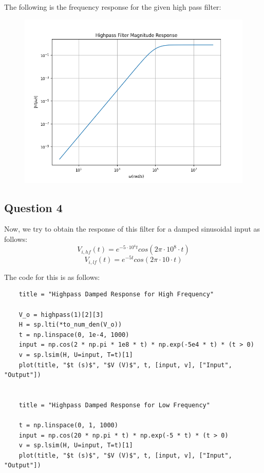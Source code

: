 \documentclass[12pt, a4paper]{article}
\begin{document}
The following is the frequency response for the given high pass filter:

\begin{figure}[H]
    \centering
    \includegraphics[scale=0.6]{3.png}
\end{figure}

\subsection{Question 4}
Now, we try to obtain the response of this filter for a damped sinusoidal input as follows:
\[V_{i, hf}(t) = e^{-5 \cdot 10^4t} cos(2\pi \cdot 10^8 \cdot t) \]
\[V_{i, lf}(t) = e^{-5t} cos(2\pi \cdot 10 \cdot t)\]

The code for this is as follows:
\begin{lstlisting}
    title = "Highpass Damped Response for High Frequency"

    V_o = highpass(1)[2][3]
    H = sp.lti(*to_num_den(V_o))
    t = np.linspace(0, 1e-4, 1000)
    input = np.cos(2 * np.pi * 1e8 * t) * np.exp(-5e4 * t) * (t > 0)
    v = sp.lsim(H, U=input, T=t)[1]
    plot(title, "$t (s)$", "$V (V)$", t, [input, v], ["Input", "Output"])
    
    
    title = "Highpass Damped Response for Low Frequency"
    
    t = np.linspace(0, 1, 1000)
    input = np.cos(20 * np.pi * t) * np.exp(-5 * t) * (t > 0)
    v = sp.lsim(H, U=input, T=t)[1]
    plot(title, "$t (s)$", "$V (V)$", t, [input, v], ["Input", "Output"])
\end{lstlisting}
\end{document}
